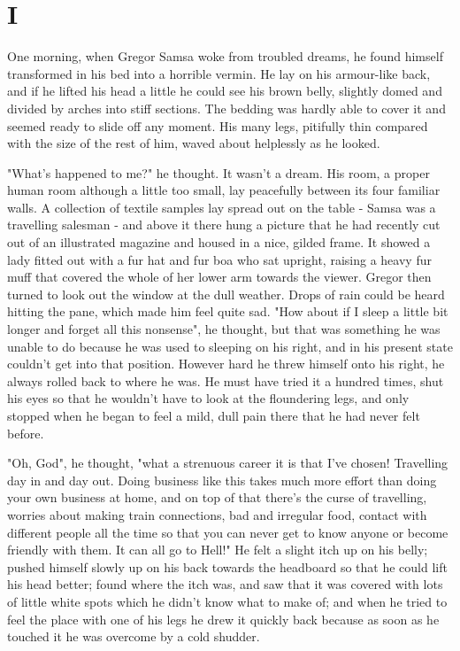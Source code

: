 \chapter{I}

One morning, when Gregor Samsa woke from troubled dreams, he found himself transformed in his bed into a horrible vermin. He lay on his armour-like back, and if he lifted his head a little he could see his brown belly, slightly domed and divided by arches into stiff sections. The bedding was hardly able to cover it and seemed ready to slide off any moment. His many legs, pitifully thin compared with the size of the rest of him, waved about helplessly as he looked.

"What's happened to me?" he thought. It wasn't a dream. His room, a proper human room although a little too small, lay peacefully between its four familiar walls. A collection of textile samples lay spread out on the table - Samsa was a travelling salesman - and above it there hung a picture that he had recently cut out of an illustrated magazine and housed in a nice, gilded frame. It showed a lady fitted out with a fur hat and fur boa who sat upright, raising a heavy fur muff that covered the whole of her lower arm towards the viewer. Gregor then turned to look out the window at the dull weather. Drops of rain could be heard hitting the pane, which made him feel quite sad. "How about if I sleep a little bit longer and forget all this nonsense", he thought, but that was something he was unable to do because he was used to sleeping on his right, and in his present state couldn't get into that position. However hard he threw himself onto his right, he always rolled back to where he was. He must have tried it a hundred times, shut his eyes so that he wouldn't have to look at the floundering legs, and only stopped when he began to feel a mild, dull pain there that he had never felt before.

"Oh, God", he thought, "what a strenuous career it is that I've chosen! Travelling day in and day out. Doing business like this takes much more effort than doing your own business at home, and on top of that there's the curse of travelling, worries about making train connections, bad and irregular food, contact with different people all the time so that you can never get to know anyone or become friendly with them. It can all go to Hell!" He felt a slight itch up on his belly; pushed himself slowly up on his back towards the headboard so that he could lift his head better; found where the itch was, and saw that it was covered with lots of little white spots which he didn't know what to make of; and when he tried to feel the place with one of his legs he drew it quickly back because as soon as he touched it he was overcome by a cold shudder.

